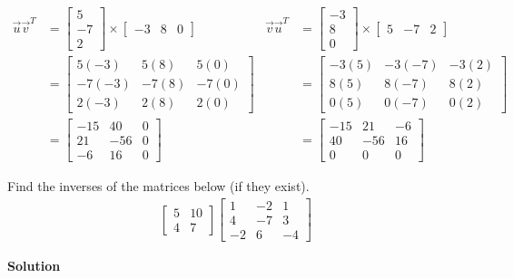 \documentclass[11pt]{scrartcl}
\theoremstyle{dotlessP}
\theoremstyle{dotlessN}
\begin{document}
\begin{align*}
	\vec{u}\vec{v}^T &=
	\begin{bmatrix}
		5 \\
		-7 \\
		2
	\end{bmatrix} \times
	\begin{bmatrix}
		-3 & 8 & 0
	\end{bmatrix} & 
	\vec{v}\vec{u}^T &= 
	\begin{bmatrix}
		-3 \\
		8 \\
		0
	\end{bmatrix} \times
	\begin{bmatrix}
		5 & -7 & 2
	\end{bmatrix}
	\\
					 &= 
	\begin{bmatrix}
		5(-3) & 5(8) & 5(0) \\
		-7(-3) & -7(8) & -7(0) \\
		2(-3) & 2(8) & 2(0)
	\end{bmatrix} &
					 &=
					 \begin{bmatrix}
						 -3(5) & -3(-7) & -3(2) \\
						 8(5) & 8(-7) & 8(2) \\
						 0(5) & 0(-7) & 0(2)
					 \end{bmatrix}
	\\
					 &= 
					 \begin{bmatrix}
						 -15 & 40 & 0 \\
						 21 & -56 & 0 \\
						 -6 & 16 & 0
					 \end{bmatrix} &
					 &=
					 \begin{bmatrix}
						 -15 & 21 & -6 \\
						 40 & -56 & 16 \\
						 0 & 0 & 0 
					 \end{bmatrix}
\end{align*}
\begin{ques}
	Find the inverses of the matrices below (if they exist). 
    \begin{align*}
        \begin{bmatrix}
            5 & 10 \\ 4 & 7
        \end{bmatrix}
        \begin{bmatrix}
            1 & -2 & 1 \\ 4 & -7 & 3 \\ -2 & 6 & -4
        \end{bmatrix}
    \end{align*}
\end{ques}
\textbf{Solution}
\end{document}
